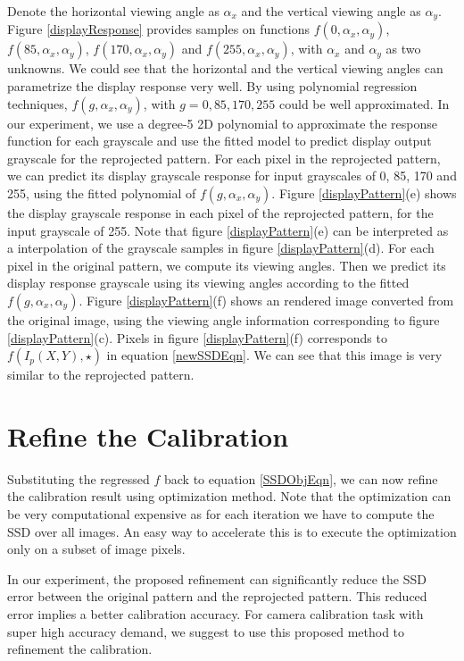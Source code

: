 \documentclass{report}
\begin{document}
Denote the horizontal viewing angle as $\alpha_x$ and the vertical viewing angle as $\alpha_y$. Figure \ref{displayResponse} provides samples on functions $f(0, \alpha_x, \alpha_y)$, $f(85, \alpha_x, \alpha_y)$, $f(170, \alpha_x, \alpha_y)$ and $f(255, \alpha_x, \alpha_y)$, with $\alpha_x$ and $\alpha_y$ as two unknowns. We could see that the horizontal and the vertical viewing angles can parametrize the display response very well. By using polynomial regression techniques, $f(g, \alpha_x, \alpha_y)$, with $g = 0, 85, 170, 255$ could be well approximated. In our experiment, we use a degree-5 2D polynomial to approximate the response function for each grayscale and use the fitted model to predict display output grayscale for the reprojected pattern. For each pixel in the reprojected pattern, we can predict its display grayscale response for input grayscales  of 0, 85, 170 and 255, using the fitted polynomial of $f(g, \alpha_x, \alpha_y)$. Figure \ref{displayPattern}(e) shows the display grayscale response in each pixel of the reprojected pattern, for the input grayscale of 255. Note that figure \ref{displayPattern}(e) can be interpreted as a interpolation of the grayscale samples in figure \ref{displayPattern}(d). For each pixel in the original pattern, we compute its viewing angles. Then we predict its display response grayscale using its viewing angles according to the fitted $f(g, \alpha_x, \alpha_y)$. Figure \ref{displayPattern}(f) shows an rendered image converted from the original image, using the viewing angle information corresponding to figure \ref{displayPattern}(c). Pixels in figure \ref{displayPattern}(f) corresponds to $f(I_p(X, Y), \star)$ in equation \ref{newSSDEqn}. We can see that this image is very similar to the reprojected pattern. 


\section{Refine the Calibration}
Substituting the regressed $f$ back to equation \ref{SSDObjEqn}, we can now refine the calibration result using optimization method. Note that the optimization can be very computational expensive as for each iteration we have to compute the SSD over all images. An easy way to accelerate this is to execute the optimization only on a subset of image pixels. 

In our experiment, the proposed refinement can significantly reduce the SSD error between the original pattern and the reprojected pattern. This reduced error implies a better calibration accuracy. For camera calibration task with super high accuracy demand, we suggest to use this proposed method to refinement the calibration. 


\end{document}
